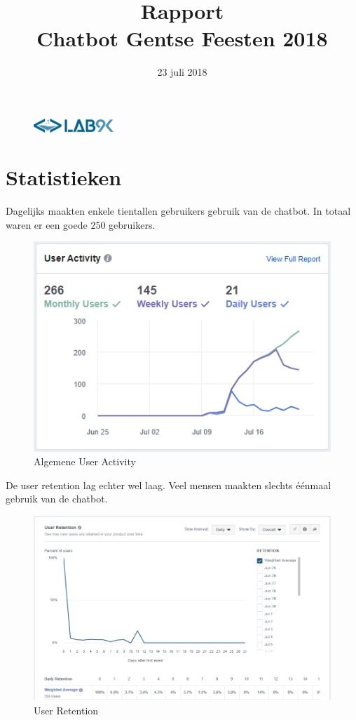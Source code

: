 \documentclass[11pt, letterpaper, oneside]{article}
\title{Rapport \\ Chatbot Gentse Feesten 2018}
\author{}
\date{23 juli 2018}
\begin{document}
	\begin{figure}
			\includegraphics[width=0.27\textwidth,keepaspectratio]{figuren/logo} %
	\end{figure}
	\vspace*{0.35cm}
	
	\noindent
	\fontsize{30pt}{28pt}\selectfont\textcolor{priColour}{\textbf{\@title}}\newline
	
	\fontsize{11pt}{15pt}\selectfont
	
	
	\section{Statistieken}
	
	Dagelijks maakten enkele tientallen gebruikers gebruik van de chatbot. In totaal waren er een goede 250 gebruikers.

	\begin{figure}[h]
		\centering
		\includegraphics[width=0.7\linewidth]{./figuren/user-activity}
		\caption{Algemene User Activity}
		\label{user-activity}
	\end{figure}

	\clearpage

	De user retention lag echter wel laag. Veel mensen maakten slechts éénmaal gebruik van de chatbot.
	
	\begin{figure}[h]
		\centering
		\includegraphics[width=0.7\linewidth]{./figuren/user-retention}
		\caption{User Retention}
		\label{user-retention}
	\end{figure}
\end{document}
